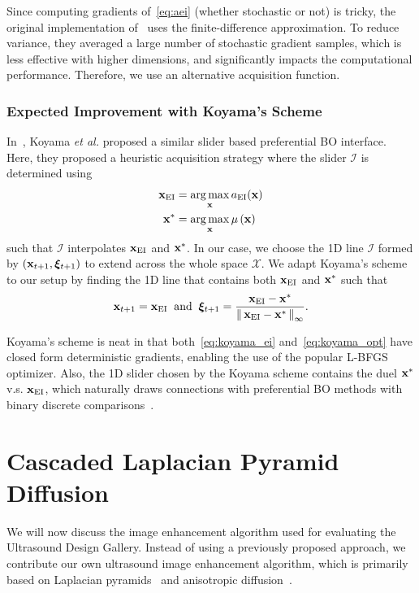 Since computing gradients of~\cref{eq:aei} (whether stochastic or not) is tricky, the original implementation of~\cite{pmlr-v119-mikkola20a} uses the finite-difference approximation.
To reduce variance, they averaged a large number of stochastic gradient samples, which is less effective with higher dimensions, and significantly impacts the computational performance.
Therefore, we use an alternative acquisition function.

\subsubsection{Expected Improvement with Koyama's Scheme}
In~\cite{10.1145/3072959.3073598}, Koyama \textit{et al.} proposed a similar slider based preferential BO interface.
Here, they proposed a heuristic acquisition strategy where the slider \(\mathcal{I}\) is determined using
\begin{align}
  \mathbf{x}_{\mathrm{EI}}   &= \operatorname*{arg\,max}_{\mathbf{x}} a_{\mathrm{EI}}(\mathbf{x}) \label{eq:koyama_ei} \\
  \mathbf{x}^*   &= \operatorname*{arg\,max}_{\mathbf{x}} \mu\,(\mathbf{x}) \label{eq:koyama_opt}
\end{align}
such that \(\mathcal{I}\) interpolates \(\mathbf{x}_{\mathrm{EI}}\) and \(\mathbf{x}^*\).
In our case, we choose the 1D line \(\mathcal{I}\) formed by \((\mathbf{x}_{t+1}, \bm{\xi}_{t+1})\) to extend across the whole space \(\mathcal{X}\).
We adapt Koyama's scheme to our setup by finding the 1D line that contains both \(\mathbf{x}_{\mathrm{EI}}\) and \(\mathbf{x}^*\) such that
\begin{align}
  \mathbf{x}_{t+1}   = \mathbf{x}_{\mathrm{EI}}\;\; \text{and} \;\;
  \bm{\xi}_{t+1} = \frac{\mathbf{x}_{\mathrm{EI}} - \mathbf{x}^*}{\left\lVert\,  \mathbf{x}_{\mathrm{EI}} - \mathbf{x}^*  \,\right\rVert_{\infty}}.\label{eq:xi_proj}
\end{align}

Koyama's scheme is neat in that both~\cref{eq:koyama_ei} and~\cref{eq:koyama_opt} have closed form deterministic gradients, enabling the use of the popular L-BFGS~\cite{liu_limited_1989} optimizer.
Also, the 1D slider chosen by the Koyama scheme contains the duel \(\mathbf{x}^*\) v.s. \(\mathbf{x}_{\mathrm{EI}}\), which naturally draws connections with preferential BO methods with binary discrete comparisons~\cite{NIPS2007_b6a1085a}.


\section{Cascaded Laplacian Pyramid Diffusion}\label{section:filter}

We will now discuss the image enhancement algorithm used for evaluating the Ultrasound Design Gallery.
Instead of using a previously proposed approach, we contribute our own ultrasound image enhancement algorithm, which is primarily based on Laplacian pyramids~\cite{zhang_multiscale_2006, zhang_nonlinear_2007, kang_new_2016} and anisotropic diffusion~\cite{perona_scalespace_1990, weickert_anisotropic_1998}.

